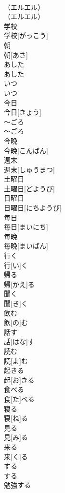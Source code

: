 \documentclass[8pt]{extreport}
\begin{document}
\begin{CJK}{UTF8}{min}
\\	（エルエル）	
\\	（エルエル）
\\	学校	
\\	学校[がっこう]
\\	朝	
\\	朝[あさ]
\\	あした	
\\	あした
\\	いつ	
\\	いつ
\\	今日	
\\	今日[きょう]
\\	〜ごろ	
\\	〜ごろ
\\	今晩	
\\	今晩[こんばん]
\\	週末	
\\	週末[しゅうまつ]
\\	土曜日	
\\	土曜日[どようび]
\\	日曜日	
\\	日曜日[にちようび]
\\	毎日	
\\	毎日[まいにち]
\\	毎晩	
\\	毎晩[まいばん]
\\	行く	
\\	行[い]く
\\	帰る	
\\	帰[かえ]る
\\	聞く	
\\	聞[き]く
\\	飲む	
\\	飲[の]む
\\	話す	
\\	話[はな]す
\\	読む	
\\	読[よ]む
\\	起きる	
\\	起[お]きる
\\	食べる	
\\	食[た]べる
\\	寝る	
\\	寝[ね]る
\\	見る	
\\	見[み]る
\\	来る	
\\	来[く]る
\\	する	
\\	する
\\	勉強する	

\end{CJK}
\end{document}
